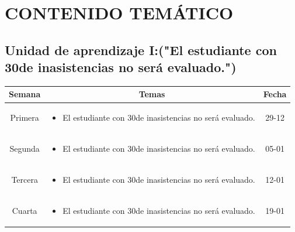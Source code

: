 \documentclass[a4paper]{article}
\begin{document}
\section{CONTENIDO TEMÁTICO}
\subsection{Unidad de aprendizaje I:("El estudiante con 30de inasistencias no será evaluado.")}
\begin{table}[ht]
\centering
\begin{tabular}{|c|c|c|}
\hline
\textbf{Semana} & \textbf{Temas} & \textbf{Fecha} \\ 
\hline
Primera 
& \begin{minipage}[t]{10cm}
\begin{itemize}
\item El estudiante con 30de inasistencias no será evaluado.
\end{itemize}
\end{minipage} & 29-12\\ 
\hline 
Segunda 
& \begin{minipage}[t]{10cm}
\begin{itemize}
\item El estudiante con 30de inasistencias no será evaluado.
\end{itemize}
\end{minipage} & 05-01\\ 
\hline 
Tercera 
& \begin{minipage}[t]{10cm}
\begin{itemize}
\item El estudiante con 30de inasistencias no será evaluado.
\end{itemize}
\end{minipage} & 12-01 \\ 
\hline 
Cuarta 
& \begin{minipage}[t]{10cm}
\begin{itemize}
\item El estudiante con 30de inasistencias no será evaluado.
\end{itemize}
\end{minipage} & 19-01 \\ 
\hline 
\end{tabular}
\end{table} 
\newpage
\end{document}
